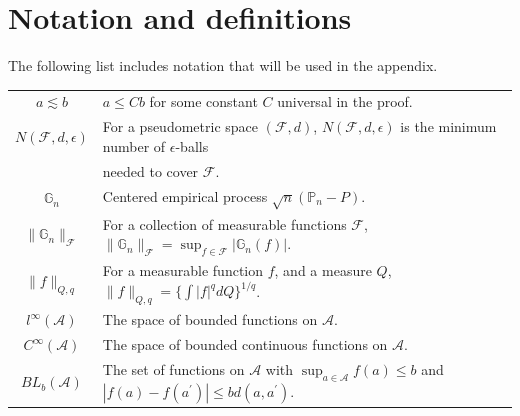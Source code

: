 \documentclass[12pt,oneside,reqno,english]{amsart}
\theoremstyle{definition}
\begin{document}
\section{Notation and definitions}
The following list includes notation that will be used in the appendix.
\begin{center}
\begin{tabular}{cl}
\hline 
$a \lesssim b$ & $a\leq Cb$ for some constant $C$ universal in the proof.\\
$N(\mathcal{F},d,\epsilon)$  & For a pseudometric space $(\mathcal{F},d)$, $N(\mathcal{F},d,\epsilon)$ is the minimum number of $\epsilon$-balls\\
 & needed to cover $\mathcal{F}$. \\
$\mathbb{G}_{n}$  & Centered empirical process  $\sqrt{n}(\mathbb{P}_{n}-P)$.\\
$\|\mathbb{G}_{n}\|_{\mathcal{F}}$ & For a collection of measurable functions $\mathcal{F}$, $\|\mathbb{G}_{n}\|_{\mathcal{F}}=\sup_{f\in \mathcal{F}}|\mathbb{G}_{n}(f)|$. \\
$\|f \|_{Q,q}$  & For a measurable function $f$, and a measure $Q$, $\|f \|_{Q,q}=\{\int |f|^{q}dQ\}^{1/q}$.\\
$l^{\infty}(\mathcal{A})$  & The space of bounded functions on $\mathcal{A}$. \\
$C^{\infty}(\mathcal{A})$  & The space of bounded continuous functions on $\mathcal{A}$. \\
$BL_{b}(\mathcal{A})$  & The set of functions on $\mathcal{A}$ with $\sup_{a\in \mathcal{A}} f(a)\leq b$ and $|f(a)-f(a^{\prime})|\leq bd(a,a^{\prime})$. \\
\hline 
\end{tabular}\vspace{2cm}
\end{center}
\end{document}
